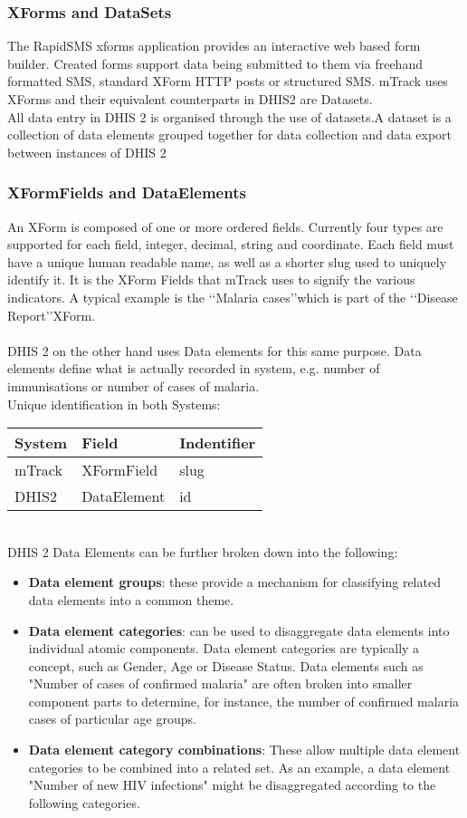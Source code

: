 \documentclass[11pt,a4paper]{article}
\begin{document}
\subsubsection{XForms and DataSets}
The RapidSMS xforms application provides an interactive web based form builder. Created forms support data being submitted to them via freehand formatted SMS, standard XForm HTTP posts or structured SMS. mTrack uses XForms and their equivalent counterparts in DHIS2 are Datasets.\\
All data entry in DHIS 2 is organised through the use of datasets.A dataset is a collection of data elements grouped together for data collection and data export between
instances of DHIS 2
\subsubsection{XFormFields and DataElements}
An XForm is composed of one or more ordered fields. Currently four types are supported for each field, integer, decimal, string and coordinate. Each field must have a unique human readable name, as well as a shorter slug used to uniquely identify it. It is the XForm Fields that mTrack uses to signify the various indicators. A typical example is the \lq\lq Malaria cases\rq\rq  which is part of the \lq\lq Disease Report\rq\rq XForm.\\\\
DHIS 2 on the other hand uses Data elements for this same purpose. Data elements define what is actually recorded in system, e.g. number of
immunisations or number of cases of malaria.\\
Unique identification in both Systems:
\begin{table}[h!]
	\begin{tabular}{|l|l|l|}
		\hline
		System & Field & Indentifier\\
		\hline
		mTrack & XFormField & slug\\
		\hline
		DHIS2 & DataElement & id\\
		\hline
	\end{tabular}
\end{table}
\\
DHIS 2 Data Elements can be further broken down into the following:
\begin{itemize}
\item \textbf{Data element groups}: these provide a mechanism for classifying related data elements into a common theme.
\item \textbf{Data element categories}: can be used to disaggregate data elements into individual atomic components. Data element
categories are typically a concept, such as Gender, Age or Disease Status. Data elements such as "Number of cases of
confirmed malaria" are often broken into smaller component parts to determine, for instance, the number of confirmed
malaria cases of particular age groups.
\item \textbf{Data element category combinations}: These allow multiple data element categories to be combined into a related set. As an example, a data element "Number of new HIV infections" might be disaggregated according to the following categories.
\end{itemize}
\end{document}
